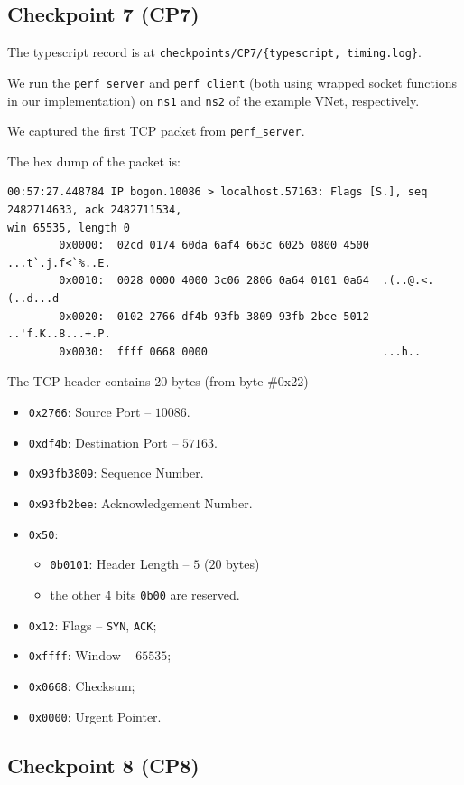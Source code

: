 \documentclass[a4paper]{article}
\begin{document}
  \subsection{Checkpoint 7 (CP7)}

  The typescript record is at \texttt{checkpoints/CP7/\{typescript, timing.log\}}.

  We run the \texttt{perf\_server} and \texttt{perf\_client} (both using wrapped socket functions in our implementation) on \texttt{ns1} and \texttt{ns2} of the example VNet, respectively.

  We captured the first TCP packet from \texttt{perf\_server}.

  The hex dump of the packet is:
  \begin{verbatim}
00:57:27.448784 IP bogon.10086 > localhost.57163: Flags [S.], seq 2482714633, ack 2482711534,
win 65535, length 0
        0x0000:  02cd 0174 60da 6af4 663c 6025 0800 4500  ...t`.j.f<`%..E.
        0x0010:  0028 0000 4000 3c06 2806 0a64 0101 0a64  .(..@.<.(..d...d
        0x0020:  0102 2766 df4b 93fb 3809 93fb 2bee 5012  ..'f.K..8...+.P.
        0x0030:  ffff 0668 0000                           ...h..
  \end{verbatim}

  The TCP header contains 20 bytes (from byte \#0x22)
  \begin{itemize}
    \item \texttt{0x2766}: Source Port -- $10086$.
    \item \texttt{0xdf4b}: Destination Port -- $57163$.
    \item \texttt{0x93fb3809}: Sequence Number.
    \item \texttt{0x93fb2bee}: Acknowledgement Number.
    \item \texttt{0x50}: \begin{itemize}
      \item \texttt{0b0101}: Header Length -- $5$ ($20$ bytes)
      \item the other 4 bits \texttt{0b00} are reserved.
    \end{itemize}
    \item \texttt{0x12}: Flags -- \texttt{SYN}, \texttt{ACK};
    \item \texttt{0xffff}: Window -- $65535$;
    \item \texttt{0x0668}: Checksum;
    \item \texttt{0x0000}: Urgent Pointer.
  \end{itemize}

  \subsection{Checkpoint 8 (CP8)}
\end{document}
